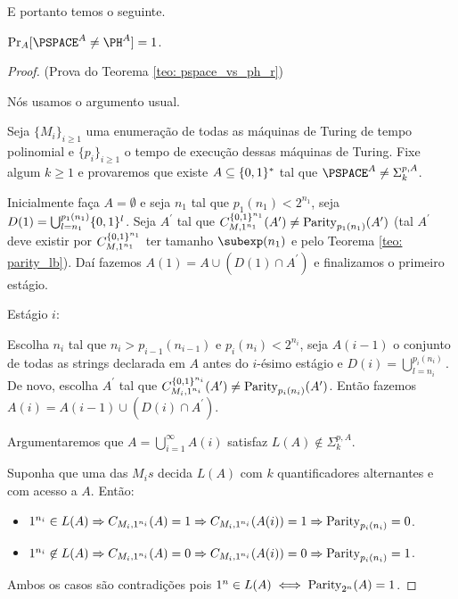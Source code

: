 E portanto temos o seguinte.

\begin{teo} \label{teo: pspace_vs_ph_random}

$\Pr_{A}[\PSPACE^{A} \neq \PH^{A}] = 1$.

\end{teo}

\begin{proof} (Prova do Teorema \ref{teo: pspace_vs_ph_r})

Nós usamos o argumento usual.

Seja $\{M_{i}\}_{i \geq 1}$ uma enumeração de todas as máquinas de Turing de tempo polinomial e $\{p_{i}\}_{i \geq 1}$ o tempo de execução dessas máquinas de Turing. Fixe algum $k \geq 1$ e provaremos que existe $A \subseteq \{0, 1\}^{*}$ tal que $\PSPACE^{A} \neq \Sigma_{k}^{p, A}$.

Inicialmente faça $A = \emptyset$ e seja $n_{1}$ tal que $p_{1}(n_{1}) < 2^{n_{1}}$, seja $D(1) = \bigcup_{l = n_{1}}^{p_{1}(n_{1})} \{0, 1\}^{l}$. Seja $A^{\prime}$ tal que $C_{M, 1^{n_{1}}}^{\{0, 1\}^{n_{1}}}(A^{\prime}) \neq \text{Parity}_{p_{1}(n_{1})}(A^{\prime})$ (tal $A^{\prime}$ deve existir por $C_{M, 1^{n_{1}}}^{\{0, 1\}^{n_{1}}}$ ter tamanho $\subexp(n_{1})$ e pelo Teorema \ref{teo: parity_lb}). Daí fazemos $A(1) = A \cup (D(1) \cap A^{\prime})$ e finalizamos o primeiro estágio.

Estágio $i$:

Escolha $n_{i}$ tal que $n_{i} > p_{i - 1}(n_{i - 1})$ e $p_{i}(n_{i}) < 2^{n_{i}}$, seja $A(i - 1)$ o conjunto de todas as strings declarada em $A$ antes do $i$-ésimo estágio e $D(i) = \bigcup_{l = n_{i}}^{p_{i}(n_{i})}$. De novo, escolha $A^{\prime}$ tal que $C_{M_{i}, 1^{n_{i}}}^{\{0, 1\}^{n_{i}}}(A^{\prime}) \neq \text{Parity}_{p_{i}(n_{i})}(A^{\prime})$. Então fazemos $A(i) = A(i - 1) \cup (D(i) \cap A^{\prime})$.

Argumentaremos que $A = \bigcup_{i = 1}^{\infty}A(i)$ satisfaz $L(A) \not\in \Sigma_{k}^{p, A}$.

Suponha que uma das $M_{i}s$ decida $L(A)$ com $k$ quantificadores alternantes e com acesso a $A$. Então:

\begin{itemize}

    \item $1^{n_{i}} \in L(A) \Rightarrow C_{M_{i}, 1^{n_{i}}}(A) = 1 \Rightarrow C_{M_{i}, 1^{n_{i}}}(A(i)) = 1 \Rightarrow \text{Parity}_{p_{i}(n_{i})} = 0$.

    \item $1^{n_{i}} \not\in L(A) \Rightarrow C_{M_{i}, 1^{n_{i}}}(A) = 0 \Rightarrow C_{M_{i}, 1^{n_{i}}}(A(i)) = 0 \Rightarrow \text{Parity}_{p_{i}(n_{i})} = 1$.

\end{itemize}

Ambos os casos são contradições pois $1^{n} \in L(A) \iff \text{Parity}_{2^{n}}(A) = 1$.
\end{proof}

